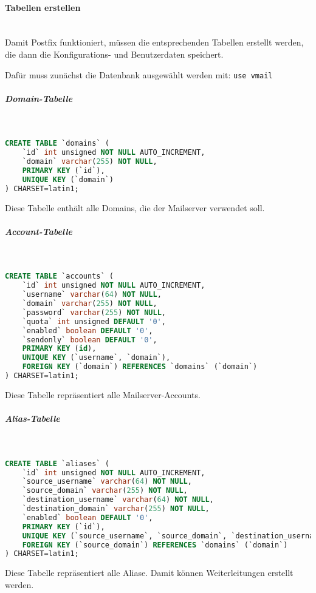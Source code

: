 \paragraph{Tabellen erstellen}\mbox{}\\
Damit Postfix funktioniert, müssen die entsprechenden Tabellen erstellt werden, die dann die Konfigurations- und Benutzerdaten speichert.

Dafür muss zunächst die Datenbank ausgewählt werden mit:\newline
\verb|use vmail|\newline

\subparagraph{Domain-Tabelle}\mbox{}\\
\begin{lstlisting}[language=SQL, caption=vmail - Domain-Tabelle]
CREATE TABLE `domains` (
	`id` int unsigned NOT NULL AUTO_INCREMENT,
	`domain` varchar(255) NOT NULL,
	PRIMARY KEY (`id`),
	UNIQUE KEY (`domain`)
) CHARSET=latin1;
\end{lstlisting}
Diese Tabelle enthält alle Domains, die der Mailserver verwendet soll.

\subparagraph{Account-Tabelle}\mbox{}\\
\begin{lstlisting}[language=SQL, caption=vmail - Account-Tabelle]
CREATE TABLE `accounts` (
	`id` int unsigned NOT NULL AUTO_INCREMENT,
	`username` varchar(64) NOT NULL,
	`domain` varchar(255) NOT NULL,
	`password` varchar(255) NOT NULL,
	`quota` int unsigned DEFAULT '0',
	`enabled` boolean DEFAULT '0',
	`sendonly` boolean DEFAULT '0',
	PRIMARY KEY (id),
	UNIQUE KEY (`username`, `domain`),
	FOREIGN KEY (`domain`) REFERENCES `domains` (`domain`)
) CHARSET=latin1;
\end{lstlisting}
Diese Tabelle repräsentiert alle Mailserver-Accounts.

\subparagraph{Alias-Tabelle}\mbox{}\\
\begin{lstlisting}[language=SQL, caption=vmail - Alias-Tabelle]
CREATE TABLE `aliases` (
	`id` int unsigned NOT NULL AUTO_INCREMENT,
	`source_username` varchar(64) NOT NULL,
	`source_domain` varchar(255) NOT NULL,
	`destination_username` varchar(64) NOT NULL,
	`destination_domain` varchar(255) NOT NULL,
	`enabled` boolean DEFAULT '0',
	PRIMARY KEY (`id`),
	UNIQUE KEY (`source_username`, `source_domain`, `destination_username`, `destination_domain`),
	FOREIGN KEY (`source_domain`) REFERENCES `domains` (`domain`)
) CHARSET=latin1;
\end{lstlisting}
Diese Tabelle repräsentiert alle Aliase. Damit können Weiterleitungen erstellt werden.

